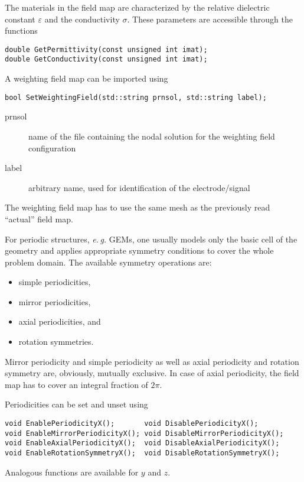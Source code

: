 The materials in the field map are characterized by the 
relative dielectric constant \(\varepsilon\) and the 
conductivity \(\sigma\). 
These parameters are accessible through the functions
\begin{lstlisting}
double GetPermittivity(const unsigned int imat);
double GetConductivity(const unsigned int imat);
\end{lstlisting}

A weighting field map can be imported using
\begin{lstlisting}
bool SetWeightingField(std::string prnsol, std::string label);
\end{lstlisting}
\begin{description}
  \item[prnsol]
  name of the file containing the nodal solution for the weighting field
  configuration
  \item[label]
  arbitrary name, used for identification of the electrode/signal
\end{description}

The weighting field map has to use the same mesh as the previously 
read ``actual'' field map.

For periodic structures, \textit{e.\,g.} GEMs, one usually models only 
the basic cell of the geometry and applies appropriate symmetry 
conditions to cover the whole problem domain. 
The available symmetry operations are:
\begin{itemize}
  \item
  simple periodicities,
  \item
  mirror periodicities, 
  \item
  axial periodicities, and
  \item
  rotation symmetries.
\end{itemize}

Mirror periodicity and simple periodicity as well as 
axial periodicity and rotation symmetry are, 
obviously, mutually exclusive. 
In case of axial periodicity, the field map has to cover an 
integral fraction of \(2\pi\). 

Periodicities can be set and unset using
\begin{lstlisting}
void EnablePeriodicityX();       void DisablePeriodicityX();
void EnableMirrorPeriodicityX(); void DisableMirrorPeriodicityX();
void EnableAxialPeriodicityX();  void DisableAxialPeriodicityX();
void EnableRotationSymmetryX();  void DisableRotationSymmetryX();
\end{lstlisting}
Analogous functions are available for \(y\) and \(z\).

